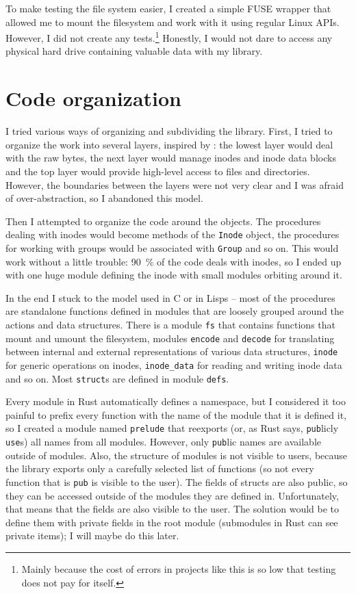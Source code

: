 To make testing the file system easier, I created a simple FUSE wrapper that
allowed me to mount the filesystem and work with it using regular Linux APIs.
However, I did not create any tests.\footnote{Mainly because the cost of errors
in projects like this is so low that testing does not pay for itself.} Honestly,
I would not dare to access any physical hard drive containing valuable data with
my library.

\section{Code organization}

I tried various ways of organizing and subdividing the library. First, I tried
to organize the work into several layers, inspired by \cite{sicp}: the lowest
layer would deal with the raw bytes, the next layer would manage inodes and
inode data blocks and the top layer would provide high-level access to files and
directories. However, the boundaries between the layers were not very clear and
I was afraid of over-abstraction, so I abandoned this model.

Then I attempted to organize the code around the objects. The procedures dealing
with inodes would become methods of the \texttt{Inode} object, the procedures
for working with groups would be associated with \texttt{Group} and so on. This
would work without a little trouble: 90~\% of the code deals with inodes, so I
ended up with one huge module defining the inode with small modules orbiting
around it.

In the end I stuck to the model used in C or in Lisps -- most of the procedures
are standalone functions defined in modules that are loosely grouped around the
actions and data structures. There is a module \texttt{fs} that contains
functions that mount and umount the filesystem, modules \texttt{encode} and
\texttt{decode} for translating between internal and external representations of
various data structures, \texttt{inode} for generic operations on inodes,
\texttt{inode\_data} for reading and writing inode data and so on. Most
\texttt{struct}s are defined in module \texttt{defs}. 

Every module in Rust automatically defines a namespace, but I considered it too
painful to prefix every function with the name of the module that it is defined
it, so I created a module named \texttt{prelude} that reexports (or, as Rust
says, \texttt{pub}licly \texttt{use}s) all names from all modules. However, only
\texttt{pub}lic names are available outside of modules. Also, the structure of
modules is not visible to users, because the library exports only a carefully
selected list of functions (so not every function that is \texttt{pub} is
visible to the user). The fields of structs are also public, so they can be
accessed outside of the modules they are defined in. Unfortunately, that means
that the fields are also visible to the user. The solution would be to define
them with private fields in the root module (submodules in Rust can see private
items); I will maybe do this later.
